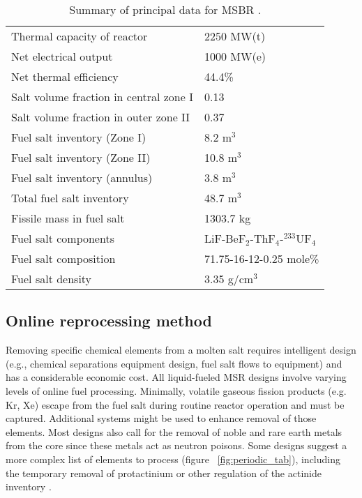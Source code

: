 \begin{table}[h!]
        \caption{Summary of principal data for MSBR 
        \cite{robertson_conceptual_1971}.}
        \begin{tabularx}{\textwidth}{ s  s}
        \hline
                Thermal capacity of reactor           		& 2250 MW(t)
                \\ Net electrical output                 		& 1000 
        MW(e) \\  Net thermal efficiency        				
        & 44.4\%
                \\  Salt volume fraction in central zone I		& 0.13
                \\ Salt volume fraction in outer zone II       & 0.37
                \\ Fuel salt inventory (Zone I)                & 8.2 m$^3$	
        \\ Fuel salt inventory (Zone II)               & 10.8 m$^3$	\\ Fuel 
        salt inventory (annulus)               & 3.8 m$^3$	\\  Total fuel 
        salt inventory                   & 48.7 m$^3$	\\ Fissile mass in fuel 
        salt                   & 1303.7 kg	\\ Fuel salt components                  
                               & LiF-BeF$_2$-ThF$_4$-$^{233}$UF$_4$	\\  
        Fuel salt composition                 & 71.75-16-12-0.25 mole\%
                \\
                Fuel salt density                    & 3.35 g/cm$^3$
                \\ \hline
        \end{tabularx}
        \label{tab:msbr_tab}
\end{table}

\subsection{Online reprocessing method}
Removing specific chemical elements from a molten salt 
requires intelligent design (e.g., chemical separations equipment design, 
fuel salt flows to equipment) and has a considerable economic cost. All 
liquid-fueled \gls{MSR} designs involve varying levels of online fuel 
processing. Minimally, volatile gaseous fission products (e.g. Kr, Xe) escape 
from the fuel salt during routine reactor operation and must be captured. 
Additional systems might be used to enhance removal of those elements. Most 
designs also call for the removal of noble and rare earth metals from the core 
since these metals act as neutron poisons. Some designs suggest a more complex 
list of elements to process (figure ~\ref{fig:periodic_tab}), including the 
temporary removal of protactinium or other regulation of the 
actinide inventory \cite{ahmad_neutronics_2015}.


